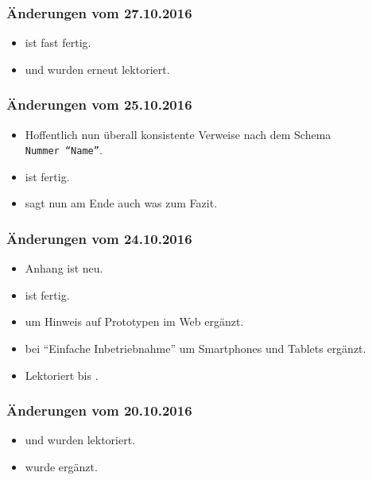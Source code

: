 \documentclass[paper=a4,fontsize=12pt,parskip=half,twoside]{scrartcl}
\begin{document}
\subsubsection*{Änderungen vom 27.10.2016}
\begin{itemize}[noitemsep]
\item {} ist fast fertig.
\item {} und  wurden erneut lektoriert.
\end{itemize}

\subsubsection*{Änderungen vom 25.10.2016}
\begin{itemize}[noitemsep]
\item Hoffentlich nun überall konsistente Verweise nach dem Schema \texttt{Nummer~"`Name"'}.
\item {} ist fertig.
\item {} sagt nun am Ende auch was zum Fazit.
\end{itemize}

\subsubsection*{Änderungen vom 24.10.2016}
\begin{itemize}[noitemsep]
\item Anhang  ist neu.
\item {} ist fertig.
\item {} um Hinweis auf Prototypen im Web ergänzt.
\item {} bei "`Einfache Inbetriebnahme"' um Smartphones und Tablets ergänzt.
\item Lektoriert bis .
\end{itemize}

\subsubsection*{Änderungen vom 20.10.2016}
\begin{itemize}[noitemsep]
\item {} und  wurden lektoriert.
\item {} wurde ergänzt.
\end{itemize}
\end{document}
